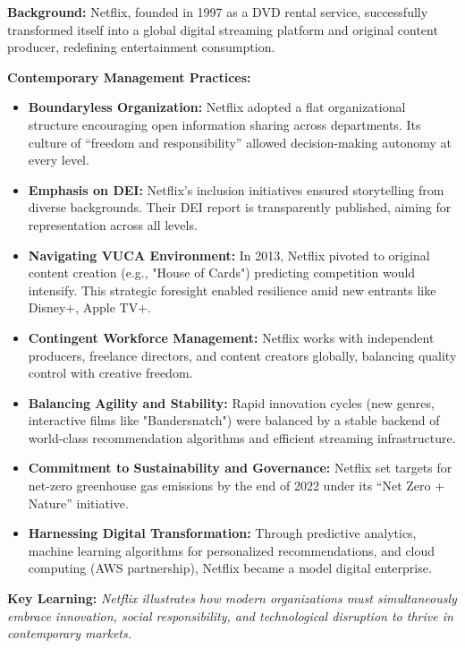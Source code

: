 \documentclass[10pt,a4paper]{book}
\begin{document}
\begin{multicols}{2}
\vspace{1cm}

\textbf{Background:}  
Netflix, founded in 1997 as a DVD rental service, successfully transformed itself into a global digital streaming platform and original content producer, redefining entertainment consumption.

\vspace{0.5cm}

\textbf{Contemporary Management Practices:}

\begin{itemize}

    \item \textbf{Boundaryless Organization:}  
    Netflix adopted a flat organizational structure encouraging open information sharing across departments. Its culture of “freedom and responsibility” allowed decision-making autonomy at every level.

    \item \textbf{Emphasis on DEI:}  
    Netflix’s inclusion initiatives ensured storytelling from diverse backgrounds. Their DEI report is transparently published, aiming for representation across all levels.

    \item \textbf{Navigating VUCA Environment:}  
    In 2013, Netflix pivoted to original content creation (e.g., "House of Cards") predicting competition would intensify. This strategic foresight enabled resilience amid new entrants like Disney+, Apple TV+.

    \item \textbf{Contingent Workforce Management:}  
    Netflix works with independent producers, freelance directors, and content creators globally, balancing quality control with creative freedom.

    \item \textbf{Balancing Agility and Stability:}  
    Rapid innovation cycles (new genres, interactive films like "Bandersnatch") were balanced by a stable backend of world-class recommendation algorithms and efficient streaming infrastructure.

    \item \textbf{Commitment to Sustainability and Governance:}  
    Netflix set targets for net-zero greenhouse gas emissions by the end of 2022 under its “Net Zero + Nature” initiative.

    \item \textbf{Harnessing Digital Transformation:}  
    Through predictive analytics, machine learning algorithms for personalized recommendations, and cloud computing (AWS partnership), Netflix became a model digital enterprise.

\end{itemize}

\vspace{0.5cm}

\textbf{Key Learning:}  
\textit{Netflix illustrates how modern organizations must simultaneously embrace innovation, social responsibility, and technological disruption to thrive in contemporary markets.}
\end{multicols}
\vspace{2cm}
\end{document}
